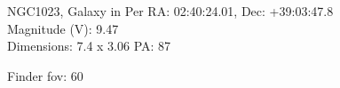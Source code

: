 \begin{block}{NGC1023, Galaxy in Per}
    RA: 02:40:24.01, Dec: +39:03:47.8 \\ 
    Magnitude (V): 9.47 \\ 
    Dimensions: 7.4 x 3.06 PA: 87 

    Finder fov: 60 
\end{block}